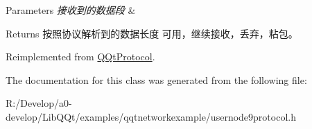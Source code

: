 \begin{DoxyParams}{Parameters}
{\em 接收到的数据段} & \\
\hline
\end{DoxyParams}
\begin{DoxyReturn}{Returns}
按照协议解析到的数据长度 可用，继续接收，丢弃，粘包。 
\end{DoxyReturn}


Reimplemented from \mbox{\hyperlink{class_q_qt_protocol_a00fd0c1ac23379ed3b9b25da9a34f39b}{Q\+Qt\+Protocol}}.



The documentation for this class was generated from the following file\+:\begin{DoxyCompactItemize}
\item 
R\+:/\+Develop/a0-\/develop/\+Lib\+Q\+Qt/examples/qqtnetworkexample/usernode9protocol.\+h\end{DoxyCompactItemize}
